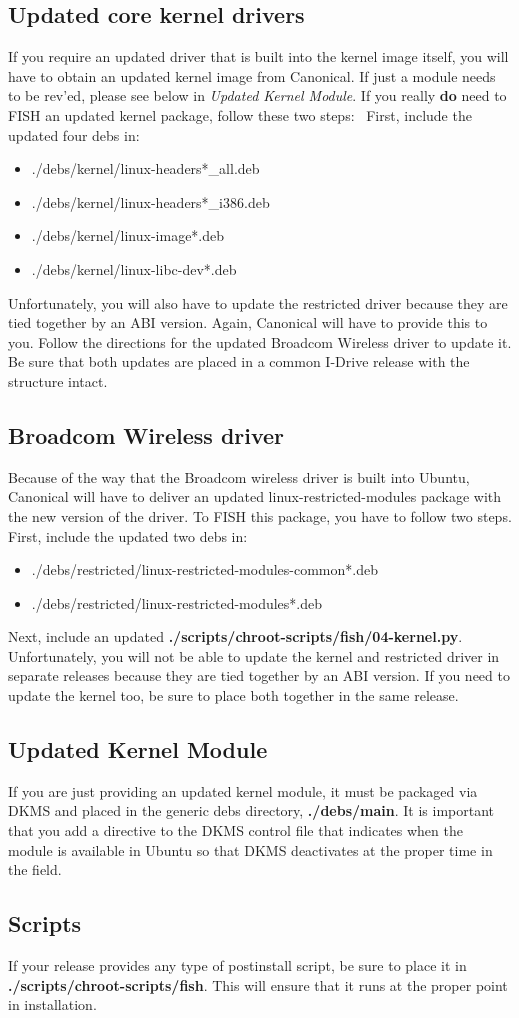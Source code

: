 \documentclass[letterpaper,10pt,titlepage]{article}
\begin{document}
\subsection{Updated core kernel drivers}
If you require an updated driver that is built into the kernel image itself, you will have to obtain an updated kernel image from Canonical.  If just a module needs to be rev'ed, please see below in \textit{Updated Kernel Module}.  If you really \textbf{do} need to FISH an updated kernel package, follow these two steps:
\
First, include the updated four debs in:
\begin{itemize}
\item ./debs/kernel/linux-headers*_all.deb
\item ./debs/kernel/linux-headers*_i386.deb
\item ./debs/kernel/linux-image*.deb
\item ./debs/kernel/linux-libc-dev*.deb
\end{itemize}
Unfortunately, you will also have to update the restricted driver because they are tied together by an ABI version.  Again, Canonical will have to provide this to you.  Follow the directions for the updated Broadcom Wireless driver to update it.  Be sure that both updates are placed in a common I-Drive release with the structure intact.

\subsection{Broadcom Wireless driver}
Because of the way that the Broadcom wireless driver is built into Ubuntu, Canonical will have to deliver an updated linux-restricted-modules package with the new version of the driver.  To FISH this package, you have to follow two steps.
\\
First, include the updated two debs in:
\begin{itemize}
\item ./debs/restricted/linux-restricted-modules-common*.deb
\item ./debs/restricted/linux-restricted-modules*.deb
\end{itemize}
Next, include an updated \textbf{./scripts/chroot-scripts/fish/04-kernel.py}.  Unfortunately, you will not be able to update the kernel and restricted driver in separate releases because they are tied together by an ABI version.  If you need to update the kernel too, be sure to place both together in the same release.

\subsection{Updated Kernel Module}
If you are just providing an updated kernel module, it must be packaged via DKMS and placed in the generic debs directory, \textbf{./debs/main}.  It is important that you add a directive to the DKMS control file that indicates when the module is available in Ubuntu so that DKMS deactivates at the proper time in the field.

\subsection{Scripts}
If your release provides any type of postinstall script, be sure to place it in \textbf{./scripts/chroot-scripts/fish}.  This will ensure that it runs at the proper point in installation.
\end{document}
